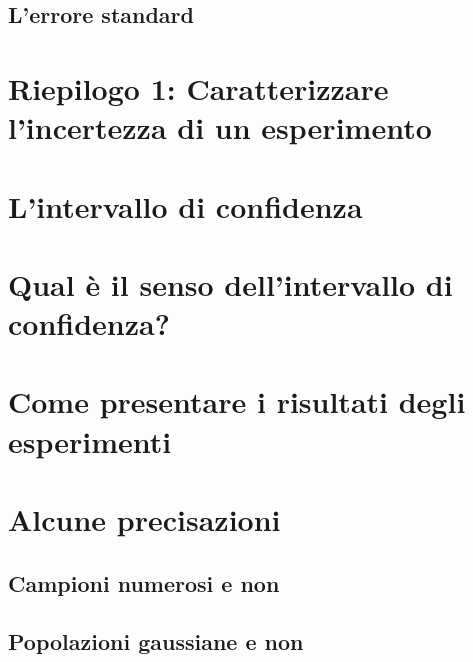 \documentclass[a4paper,12pt,oneside]{book}
\begin{document}
\hypertarget{lerrore-standard}{%
\subsection{L'errore standard}\label{lerrore-standard}}

\hypertarget{riepilogo-1-caratterizzare-lincertezza-di-un-esperimento}{%
\section{Riepilogo 1: Caratterizzare l'incertezza di un esperimento}\label{riepilogo-1-caratterizzare-lincertezza-di-un-esperimento}}

\hypertarget{lintervallo-di-confidenza}{%
\section{L'intervallo di confidenza}\label{lintervallo-di-confidenza}}

\hypertarget{qual-e-il-senso-dellintervallo-di-confidenza}{%
\section{Qual è il senso dell'intervallo di confidenza?}\label{qual-e-il-senso-dellintervallo-di-confidenza}}

\hypertarget{come-presentare-i-risultati-degli-esperimenti}{%
\section{Come presentare i risultati degli esperimenti}\label{come-presentare-i-risultati-degli-esperimenti}}

\hypertarget{alcune-precisazioni}{%
\section{Alcune precisazioni}\label{alcune-precisazioni}}

\hypertarget{campioni-numerosi-e-non}{%
\subsection{Campioni numerosi e non}\label{campioni-numerosi-e-non}}

\hypertarget{popolazioni-gaussiane-e-non}{%
\subsection{Popolazioni gaussiane e non}\label{popolazioni-gaussiane-e-non}}
\end{document}
